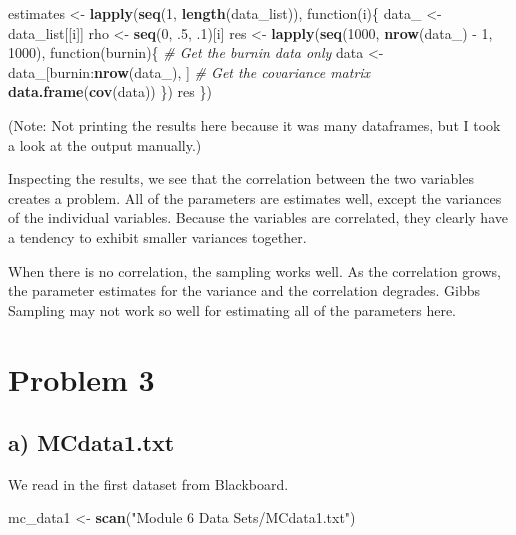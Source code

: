 \documentclass[]{article}
\newenvironment{Shaded}{\begin{snugshade}}{\end{snugshade}}
\newcommand{\KeywordTok}[1]{\textcolor[rgb]{0.13,0.29,0.53}{\textbf{{#1}}}}
\newcommand{\DecValTok}[1]{\textcolor[rgb]{0.00,0.00,0.81}{{#1}}}
\newcommand{\StringTok}[1]{\textcolor[rgb]{0.31,0.60,0.02}{{#1}}}
\newcommand{\CommentTok}[1]{\textcolor[rgb]{0.56,0.35,0.01}{\textit{{#1}}}}
\newcommand{\NormalTok}[1]{{#1}}
\begin{document}
\begin{Shaded}
\begin{Highlighting}[]
\NormalTok{estimates <-}\StringTok{ }\KeywordTok{lapply}\NormalTok{(}\KeywordTok{seq}\NormalTok{(}\DecValTok{1}\NormalTok{, }\KeywordTok{length}\NormalTok{(data_list)), function(i)\{}
  \NormalTok{data_ <-}\StringTok{ }\NormalTok{data_list[[i]]}
  \NormalTok{rho <-}\StringTok{ }\KeywordTok{seq}\NormalTok{(}\DecValTok{0}\NormalTok{, .}\DecValTok{5}\NormalTok{, .}\DecValTok{1}\NormalTok{)[i]}
  \NormalTok{res <-}\StringTok{ }\KeywordTok{lapply}\NormalTok{(}\KeywordTok{seq}\NormalTok{(}\DecValTok{1000}\NormalTok{, }\KeywordTok{nrow}\NormalTok{(data_) -}\StringTok{ }\DecValTok{1}\NormalTok{, }\DecValTok{1000}\NormalTok{), function(burnin)\{}
    \CommentTok{# Get the burnin data only}
    \NormalTok{data <-}\StringTok{ }\NormalTok{data_[burnin:}\KeywordTok{nrow}\NormalTok{(data_), ]}
    \CommentTok{# Get the covariance matrix}
    \KeywordTok{data.frame}\NormalTok{(}\KeywordTok{cov}\NormalTok{(data))}
  \NormalTok{\})}
  \NormalTok{res}
\NormalTok{\})}
\end{Highlighting}
\end{Shaded}

(Note: Not printing the results here because it was many dataframes, but
I took a look at the output manually.)

Inspecting the results, we see that the correlation between the two
variables creates a problem. All of the parameters are estimates well,
except the variances of the individual variables. Because the variables
are correlated, they clearly have a tendency to exhibit smaller
variances together.

When there is no correlation, the sampling works well. As the
correlation grows, the parameter estimates for the variance and the
correlation degrades. Gibbs Sampling may not work so well for estimating
all of the parameters here.

\section{Problem 3}\label{problem-3}

\subsection{a) MCdata1.txt}\label{a-mcdata1.txt}

We read in the first dataset from Blackboard.

\begin{Shaded}
\begin{Highlighting}[]
\NormalTok{mc_data1 <-}\StringTok{ }\KeywordTok{scan}\NormalTok{(}\StringTok{"Module 6 Data Sets/MCdata1.txt"}\NormalTok{)}
\end{Highlighting}
\end{Shaded}
\end{document}
